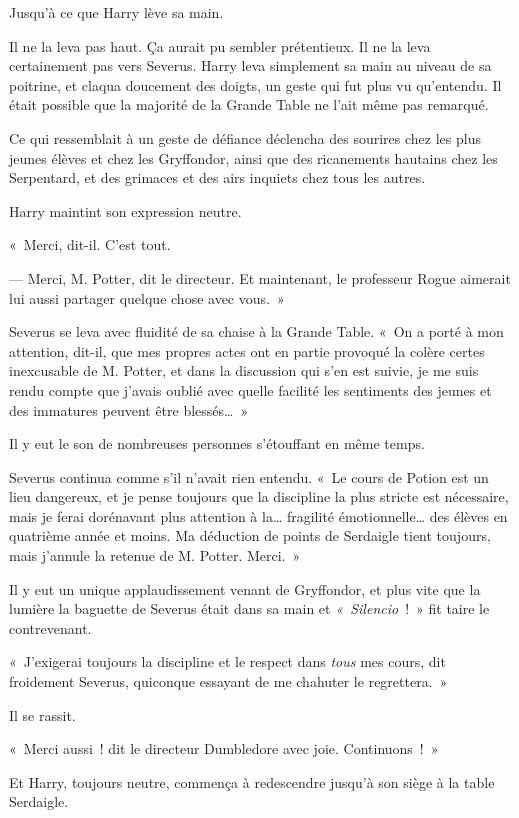 Jusqu'à ce que Harry lève sa main.

Il ne la leva pas haut.
Ça aurait pu sembler prétentieux.
Il ne la leva certainement pas vers Severus.
Harry leva simplement sa main au niveau de sa poitrine, et claqua doucement des doigts, un geste qui fut plus vu qu'entendu.
Il était possible que la majorité de la Grande Table ne l'ait même pas remarqué.

Ce qui ressemblait à un geste de défiance déclencha des sourires chez les plus jeunes élèves et chez les Gryffondor, ainsi que des ricanements hautains chez les Serpentard, et des grimaces et des airs inquiets chez tous les autres.

Harry maintint son expression neutre.

«~Merci, dit-il.
C'est tout.

--- Merci, M. Potter, dit le directeur.
Et maintenant, le professeur Rogue aimerait lui aussi partager quelque chose avec vous.~»

Severus se leva avec fluidité de sa chaise à la Grande Table.
«~On a porté à mon attention, dit-il, que mes propres actes ont en partie provoqué la colère certes inexcusable de M. Potter, et dans la discussion qui s'en est suivie, je me suis rendu compte que j'avais oublié avec quelle facilité les sentiments des jeunes et des immatures peuvent être blessés…~»

Il y eut le son de nombreuses personnes s'étouffant en même temps.

Severus continua comme s'il n'avait rien entendu.
«~Le cours de Potion est un lieu dangereux, et je pense toujours que la discipline la plus stricte est nécessaire, mais je ferai dorénavant plus attention à la… fragilité émotionnelle… des élèves en quatrième année et moins.
Ma déduction de points de Serdaigle tient toujours, mais j'annule la retenue de M. Potter.
Merci.~»

Il y eut un unique applaudissement venant de Gryffondor, et plus vite que la lumière la baguette de Severus était dans sa main et \emph{«~Silencio}~!~»
fit taire le contrevenant.

«~J'exigerai toujours la discipline et le respect dans \emph{tous} mes cours, dit froidement Severus, quiconque essayant de me chahuter le regrettera.~»

Il se rassit.

«~Merci aussi~! dit le directeur Dumbledore avec joie.
Continuons~!~»

Et Harry, toujours neutre, commença à redescendre jusqu'à son siège à la table Serdaigle.

